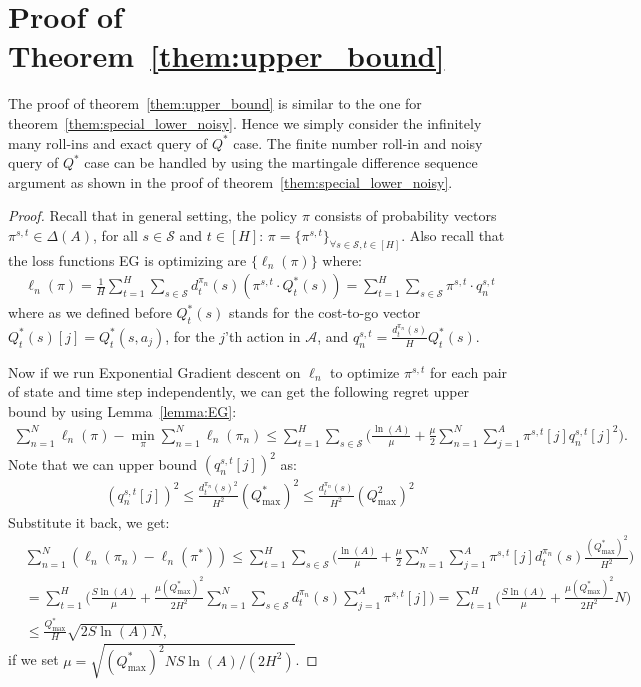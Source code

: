 \documentclass{article}
\begin{document}
\section{Proof of Theorem~\ref{them:upper_bound}}
\label{sec:proof_upper_bound}
The proof of theorem~\ref{them:upper_bound} is similar to the one for theorem~\ref{them:special_lower_noisy}. Hence we simply consider the infinitely many roll-ins and exact query of $Q^*$ case. The finite number roll-in and noisy query of $Q^*$ case can be handled by using the martingale difference sequence argument as shown in the proof of theorem~\ref{them:special_lower_noisy}.

\begin{proof}
Recall that in general setting, the policy $\pi$ consists of probability vectors $\pi^{s,t}\in\Delta(A)$, for all $s\in\mathcal{S}$ and $t\in[H]$: $\pi = \{\pi^{s,t}\}_{\forall s\in \mathcal{S},t\in[H]}$. Also recall that the loss functions EG is optimizing are $\{\ell_n(\pi)\}$ where:
\begin{align}
\ell_n(\pi) = \frac{1}{H}\sum_{t=1}^H\sum_{s\in\mathcal{S}} d_t^{\pi_n}(s) (\pi^{s,t}\cdot Q_t^*(s)) = \sum_{t=1}^H\sum_{s\in\mathcal{S}}\pi^{s,t}\cdot q_n^{s,t}
\end{align} where as we defined before $Q_t^*(s)$ stands for the cost-to-go vector $Q_t^*(s)[j] = Q_t^*(s,a_j)$, for the $j$'th action in $\mathcal{A}$, and $q_n^{s,t} = \frac{d_t^{\pi_n}(s)}{H}Q_t^*(s)$.  


Now if we run Exponential Gradient descent on $\ell_n$ to optimize $\pi^{s,t}$ for each pair of state and time step independently, we can get the following regret upper bound by using Lemma~\ref{lemma:EG}:
\begin{align}
\sum_{n=1}^N \ell_n(\pi) - \min_{\pi}\sum_{n=1}^N\ell_n(\pi_n) \leq \sum_{t=1}^H\sum_{s\in\mathcal{S}}\big( \frac{\ln(A)}{\mu} + \frac{\mu}{2}\sum_{n=1}^N\sum_{j=1}^A \pi^{s,t}[j] q_n^{s,t}[j]^2\big).
\end{align} Note that we can upper bound $(q_n^{s,t}[j])^2$ as:
\begin{align}
(q_n^{s,t}[j])^2 \leq \frac{d_t^{\pi_n}(s)^2}{H^2}(Q^*_{\max})^2 \leq \frac{d_t^{\pi_n}(s)}{H^2} (Q^2_{\max})^2 
\end{align}
Substitute it back, we get:
\begin{align}
&\sum_{n=1}^N (\ell_n(\pi_n) - \ell_n(\pi^*)) \leq \sum_{t=1}^H\sum_{s\in\mathcal{S}} \big(\frac{\ln(A)}{\mu} + \frac{\mu}{2}\sum_{n=1}^N\sum_{j=1}^A \pi^{s,t}[j] d_t^{\pi_n}(s)\frac{(Q^*_{\max})^2}{H^2} \big) \nonumber\\
& = \sum_{t=1}^H \big(\frac{S\ln(A)}{\mu} + \frac{\mu(Q^*_{\max})^2}{2H^2}\sum_{n=1}^N\sum_{s\in\mathcal{S}}d_t^{\pi_n}(s)\sum_{j=1}^A\pi^{s,t}[j]\big) = \sum_{t=1}^H \big( \frac{S\ln(A)}{\mu} + \frac{\mu(Q^*_{\max})^2}{2H^2}N\big) \nonumber\\
& \leq \frac{Q^*_{\max}}{H}\sqrt{2S\ln(A)N},
\end{align} if we set $\mu = \sqrt{(Q^*_{\max})^2NS\ln(A)/(2H^2)}$.


\end{proof}
\end{document}
